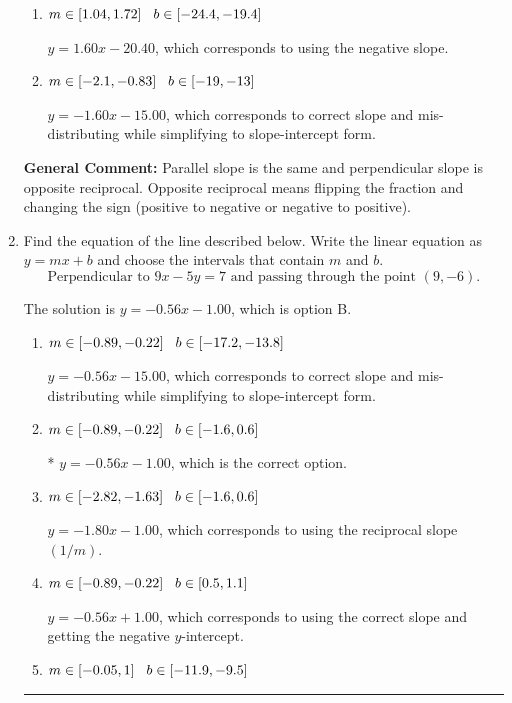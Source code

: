 \documentclass{extbook}[14pt]
\newcommand{\litem}[1]{\item #1

\rule{\textwidth}{0.4pt}}
\begin{document}
\begin{enumerate}
{\begin{enumerate}[label=\Alph*.]
 $y = -1.60x - 8.40$, which corresponds to using the correct slope and getting the negative $y$-intercept.
\item \( m \in [1.04, 1.72] \hspace*{3mm} b \in [-24.4, -19.4] \)

 $y = 1.60x - 20.40$, which corresponds to using the negative slope.
\item \( m \in [-2.1, -0.83] \hspace*{3mm} b \in [-19, -13] \)

 $y = -1.60x - 15.00$, which corresponds to correct slope and mis-distributing while simplifying to slope-intercept form.
\end{enumerate}

\textbf{General Comment:} Parallel slope is the same and perpendicular slope is opposite reciprocal. Opposite reciprocal means flipping the fraction and changing the sign (positive to negative or negative to positive).
}
\litem{
Find the equation of the line described below. Write the linear equation as $ y=mx+b $ and choose the intervals that contain $m$ and $b$.
\[ \text{Perpendicular to } 9 x - 5 y = 7 \text{ and passing through the point } (9, -6). \]

The solution is \( y = -0.56x - 1.00 \), which is option B.\begin{enumerate}[label=\Alph*.]
\item \( m \in [-0.89, -0.22] \hspace*{3mm} b \in [-17.2, -13.8] \)

 $y = -0.56x - 15.00$, which corresponds to correct slope and mis-distributing while simplifying to slope-intercept form.
\item \( m \in [-0.89, -0.22] \hspace*{3mm} b \in [-1.6, 0.6] \)

* $y = -0.56x - 1.00$, which is the correct option.
\item \( m \in [-2.82, -1.63] \hspace*{3mm} b \in [-1.6, 0.6] \)

 $y = -1.80x - 1.00$, which corresponds to using the reciprocal slope $(1/m)$.
\item \( m \in [-0.89, -0.22] \hspace*{3mm} b \in [0.5, 1.1] \)

 $y = -0.56x + 1.00$, which corresponds to using the correct slope and getting the negative $y$-intercept.
\item \( m \in [-0.05, 1] \hspace*{3mm} b \in [-11.9, -9.5] \)


\end{enumerate}}
\end{enumerate}
\end{document}
